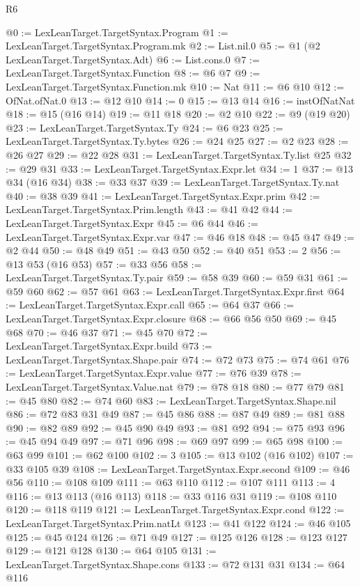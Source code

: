 \begin{lexlean}{R6}
\begin{coremodule}
@0 := LexLeanTarget.TargetSyntax.Program
@1 := LexLeanTarget.TargetSyntax.Program.mk
@2 := List.nil.{0}
@5 := @1 (@2 LexLeanTarget.TargetSyntax.Adt)
@6 := List.cons.{0}
@7 := LexLeanTarget.TargetSyntax.Function
@8 := @6 @7
@9 := LexLeanTarget.TargetSyntax.Function.mk
@10 := Nat
@11 := @6 @10
@12 := OfNat.ofNat.{0}
@13 := @12 @10
@14 := 0
@15 := @13 @14
@16 := instOfNatNat
@18 := @15 (@16 @14)
@19 := @11 @18
@20 := @2 @10
@22 := @9 (@19 @20)
@23 := LexLeanTarget.TargetSyntax.Ty
@24 := @6 @23
@25 := LexLeanTarget.TargetSyntax.Ty.bytes
@26 := @24 @25
@27 := @2 @23
@28 := @26 @27
@29 := @22 @28
@31 := LexLeanTarget.TargetSyntax.Ty.list @25
@32 := @29 @31
@33 := LexLeanTarget.TargetSyntax.Expr.let
@34 := 1
@37 := @13 @34 (@16 @34)
@38 := @33 @37
@39 := LexLeanTarget.TargetSyntax.Ty.nat
@40 := @38 @39
@41 := LexLeanTarget.TargetSyntax.Expr.prim
@42 := LexLeanTarget.TargetSyntax.Prim.length
@43 := @41 @42
@44 := LexLeanTarget.TargetSyntax.Expr
@45 := @6 @44
@46 := LexLeanTarget.TargetSyntax.Expr.var
@47 := @46 @18
@48 := @45 @47
@49 := @2 @44
@50 := @48 @49
@51 := @43 @50
@52 := @40 @51
@53 := 2
@56 := @13 @53 (@16 @53)
@57 := @33 @56
@58 := LexLeanTarget.TargetSyntax.Ty.pair
@59 := @58 @39
@60 := @59 @31
@61 := @59 @60
@62 := @57 @61
@63 := LexLeanTarget.TargetSyntax.Expr.first
@64 := LexLeanTarget.TargetSyntax.Expr.call
@65 := @64 @37
@66 := LexLeanTarget.TargetSyntax.Expr.closure
@68 := @66 @56 @50
@69 := @45 @68
@70 := @46 @37
@71 := @45 @70
@72 := LexLeanTarget.TargetSyntax.Expr.build
@73 := LexLeanTarget.TargetSyntax.Shape.pair
@74 := @72 @73
@75 := @74 @61
@76 := LexLeanTarget.TargetSyntax.Expr.value
@77 := @76 @39
@78 := LexLeanTarget.TargetSyntax.Value.nat
@79 := @78 @18
@80 := @77 @79
@81 := @45 @80
@82 := @74 @60
@83 := LexLeanTarget.TargetSyntax.Shape.nil
@86 := @72 @83 @31 @49
@87 := @45 @86
@88 := @87 @49
@89 := @81 @88
@90 := @82 @89
@92 := @45 @90 @49
@93 := @81 @92
@94 := @75 @93
@96 := @45 @94 @49
@97 := @71 @96
@98 := @69 @97
@99 := @65 @98
@100 := @63 @99
@101 := @62 @100
@102 := 3
@105 := @13 @102 (@16 @102)
@107 := @33 @105 @39
@108 := LexLeanTarget.TargetSyntax.Expr.second
@109 := @46 @56
@110 := @108 @109
@111 := @63 @110
@112 := @107 @111
@113 := 4
@116 := @13 @113 (@16 @113)
@118 := @33 @116 @31
@119 := @108 @110
@120 := @118 @119
@121 := LexLeanTarget.TargetSyntax.Expr.cond
@122 := LexLeanTarget.TargetSyntax.Prim.natLt
@123 := @41 @122
@124 := @46 @105
@125 := @45 @124
@126 := @71 @49
@127 := @125 @126
@128 := @123 @127
@129 := @121 @128
@130 := @64 @105
@131 := LexLeanTarget.TargetSyntax.Shape.cons
@133 := @72 @131 @31
@134 := @64 @116

\end{coremodule}
\end{lexlean}
